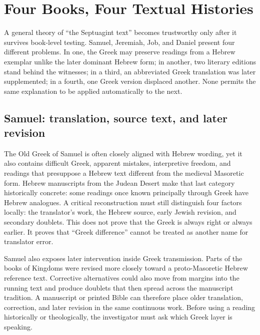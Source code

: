 \section{Four Books, Four Textual Histories}

A general theory of ``the Septuagint text'' becomes trustworthy only after it survives book-level testing. Samuel, Jeremiah, Job, and Daniel present four different problems. In one, the Greek may preserve readings from a Hebrew exemplar unlike the later dominant Hebrew form; in another, two literary editions stand behind the witnesses; in a third, an abbreviated Greek translation was later supplemented; in a fourth, one Greek version displaced another. None permits the same explanation to be applied automatically to the next.

\subsection{Samuel: translation, source text, and later revision}

The Old Greek of Samuel is often closely aligned with Hebrew wording, yet it also contains difficult Greek, apparent mistakes, interpretive freedom, and readings that presuppose a Hebrew text different from the medieval Masoretic form. Hebrew manuscripts from the Judean Desert make that last category historically concrete: some readings once known principally through Greek have Hebrew analogues. A critical reconstruction must still distinguish four factors locally: the translator's work, the Hebrew source, early Jewish revision, and secondary doublets. This does not prove that the Greek is always right or always earlier. It proves that ``Greek difference'' cannot be treated as another name for translator error.

Samuel also exposes later intervention inside Greek transmission. Parts of the books of Kingdoms were revised more closely toward a proto-Masoretic Hebrew reference text. Corrective alternatives could also move from margins into the running text and produce doublets that then spread across the manuscript tradition. A manuscript or printed Bible can therefore place older translation, correction, and later revision in the same continuous work. Before using a reading historically or theologically, the investigator must ask which Greek layer is speaking.


